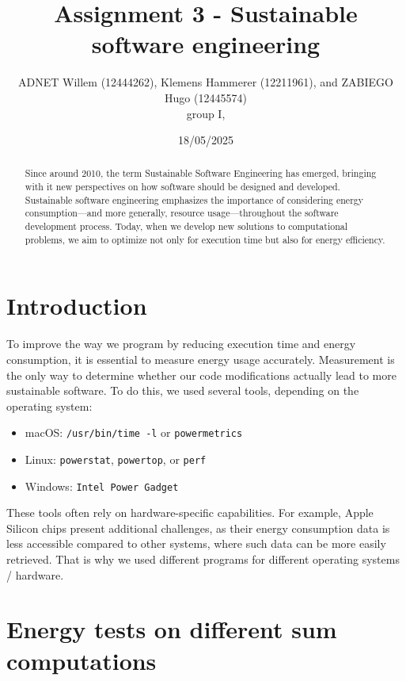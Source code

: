 \documentclass[twocolumn,10pt]{article}
\begin{document}
\title{Assignment 3 - Sustainable software engineering}
\author{ADNET Willem (12444262), Klemens Hammerer (12211961), and ZABIEGO Hugo (12445574) \\
group I, 
}

\date{18/05/2025}


\maketitle

\begin{abstract}
    Since around 2010, the term Sustainable Software Engineering has emerged, bringing with it new perspectives on how software should be designed and developed. 
    Sustainable software engineering emphasizes the importance of considering energy consumption—and more generally, resource usage—throughout the software development process. 
    Today, when we develop new solutions to computational problems, we aim to optimize not only for execution time but also for energy efficiency.
\end{abstract}

\section{Introduction}

To improve the way we program by reducing execution time and energy consumption, it is essential to measure energy usage accurately. 
Measurement is the only way to determine whether our code modifications actually lead to more sustainable software. 
To do this, we used several tools, depending on the operating system:

\begin{itemize}
    \item macOS: \texttt{/usr/bin/time -l} or \texttt{powermetrics}
    \item Linux: \texttt{powerstat}, \texttt{powertop}, or \texttt{perf}
    \item Windows: \texttt{Intel Power Gadget}
\end{itemize}

These tools often rely on hardware-specific capabilities. 
For example, Apple Silicon chips present additional challenges, as their energy consumption data is less accessible compared to other systems, where such data can be more easily retrieved.
That is why we used different programs for different operating systems / hardware.

\section{Energy tests on different sum computations}
\end{document}
